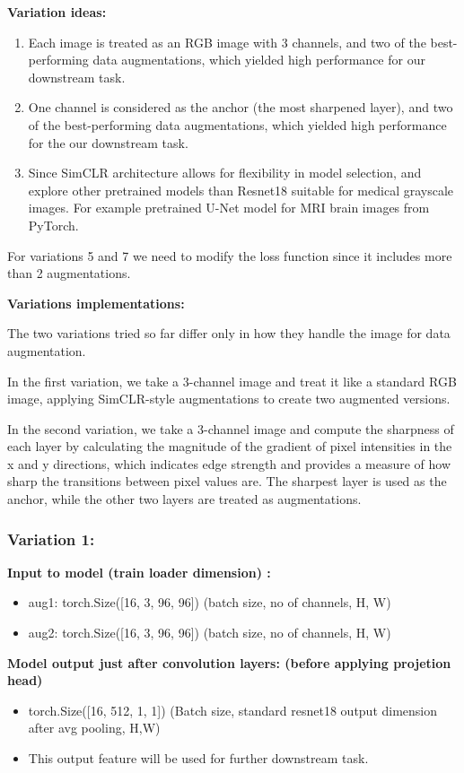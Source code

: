 \textbf{Variation ideas:}

\begin{enumerate}
  \item Each image is treated as an RGB image with 3 channels, and two of the best-performing data augmentations, which yielded high performance for our downstream 
  task.
  \item One channel is considered as the anchor (the most sharpened layer), and two of the best-performing data augmentations, which yielded high performance for 
  the our downstream task.
  \item Since SimCLR architecture \cite{chen2020simple} allows for flexibility in model selection, and explore other pretrained models  than Resnet18  suitable for
   medical grayscale 
  images. For example pretrained U-Net \cite{ronneberger2015unetconvolutionalnetworksbiomedical} model for MRI brain images from PyTorch.  
 
\end{enumerate}
For variations 5 and 7 we need to modify the loss function since it includes more than 2 augmentations.

\textbf{Variations implementations:}  \label{sec:variations_implementations}

The two variations tried so far differ only in how they handle the image for data augmentation. 

In the first variation, we take a 3-channel image and treat it like a standard RGB image, applying SimCLR-style augmentations to create two augmented versions.

In the second variation, we take a 3-channel image and compute the sharpness of each layer by calculating the magnitude of the gradient of pixel intensities in the x and y directions, which indicates edge strength and provides a measure of how sharp the transitions between pixel values are. The sharpest layer is used as the anchor, while the other two layers are treated as augmentations. 

\subsubsection{Variation 1:}
\textbf{Input to model (train loader dimension) :} 

\begin{itemize}
  \item aug1: torch.Size([16, 3, 96, 96])        (batch size, no of channels, H, W)
  \item aug2: torch.Size([16, 3, 96, 96])        (batch size, no of channels, H, W) \vspace{1em}
\end{itemize} \vspace{1em}
\textbf{Model output just after convolution layers: (before applying projetion head)} 
\begin{itemize}
  \item torch.Size([16, 512, 1, 1]) (Batch size, standard resnet18 output dimension after avg pooling, H,W)   
  \item This output feature will be used for further downstream task.  \vspace{1em}
\end{itemize}

